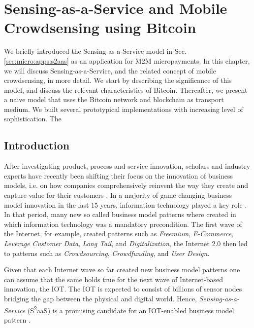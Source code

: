 \chapter{Sensing-as-a-Service and Mobile Crowdsensing using Bitcoin}
\label{sec:datamarket}

We briefly introduced the Sensing-as-a-Service model in Sec. \ref{sec:micro:apps:s2aas} as an application for M2M micropayments. 
In this chapter, we will discuss Sensing-as-a-Service, and the related concept of mobile crowdsensing, in more detail.
We start by describing the significance of this model, and discuss the relevant characteristics of Bitcoin. Thereafter, we present a naive model that uses the Bitcoin network and blockchain as transport medium. We built several prototypical implementations with increasing level of sophistication. The 

\section{Introduction}

After investigating product, process and service innovation, scholars and industry experts have recently been shifting their focus on the innovation of business models, i.e. on how companies comprehensively reinvent the way they create and capture value for their customers \parencite{osterwalder2010business, zott2011business, pohle2006ibm, gassmann2013st,timmers1998business}. In a majority of game changing business model innovation in the last 15 years, information technology played a key role \parencite{gassmann2013st}. In that period, many new so called business model patterns where created in which information technology was a mandatory precondition. The first wave of the Internet, for example, created patterns such as \emph{Freemium}, \emph{E-Commerce}, \emph{Leverage Customer Data}, \emph{Long Tail}, and \emph{Digitalization}, the Internet 2.0 then led to patterns such as \emph{Crowdsourcing}, \emph{Crowdfunding}, and \emph{User Design}. 

Given that each Internet wave so far created new business model patterns one can assume that the same holds true for the next wave of Internet-based innovation, the IOT. The IOT is expected to consist of billions of sensor nodes bridging the gap between the physical and digital world. Hence, \emph{Sensing-as-a-Service} (S\textsuperscript{2}aaS) is a promising candidate for an IOT-enabled business model pattern \parencite{weinberger,perera2014sensing, mizouni2013mobile, sheng2013sensing}.  


